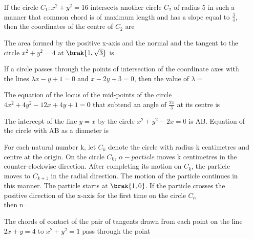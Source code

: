 	\hfill{}
\item If the circle $C_1:x^{2}+y^{2}=16$ intersects another circle $C_2$ of radius 5 in such a manner that common chord is of maximum length and has a slope equal to $\frac{3}{4}$, then the coordinates of the centre of $C_2$ are

	\hfill{}
\item The area formed by the positive x-axis and the normal and the tangent to the circle $x^{2}+y^{2}=4$ at $\brak{1,\sqrt{3}}$ is

	\hfill{}
\item If a circle passes through the points of intersection of the coordinate axes with the lines $\lambda x-y+1=0$ and $x-2y+3=0$, then the value of $\lambda =$

	\hfill{}
\item The equation of the locus of the mid-points of the circle $4x^{2}+4y^{2}-12x+4y+1=0$ that subtend an angle of $\frac{2\pi}{3}$ at its centre is

	\hfill{}
\item The intercept of the line $y=x$ by the circle $x^{2}+y^{2}-2x=0$ is AB. Equation of the circle with AB as a diameter is

	\hfill{}
\item For each natural number k, let $C_k$ denote the circle with radius k centimetres and centre at the origin. On the circle $C_k$, $\alpha-particle$ moves k centimetres in the counter-clockwise direction. After completing its motion on $C_k$, the particle moves to $C_{k+1}$ in the radial direction. The motion of the particle continues in this manner. The particle starts at $\brak{1,0}$. If the particle crosses the positive direction of the x-axis for the first time on the circle $C_n$ \\then n=

	\hfill{}
\item The chords of contact of the pair of tangents drawn from each point on the line $2x+y=4$ to $x^{2}+y^{2}=1$ pass through the point

	\hfill{}
%





